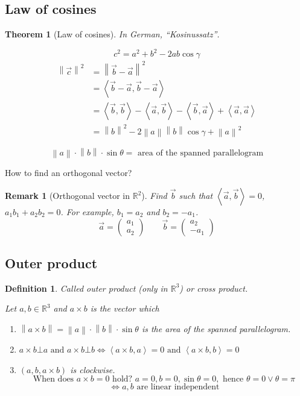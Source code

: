 \documentclass{article}
\newtheorem{theorem}{Theorem}  \numberwithin{theorem}{section}
\newtheorem{definition}{Definition}  \numberwithin{definition}{section}
\newtheorem{remark}{Remark}  \numberwithin{remark}{section}
\newcommand{\angel}[1]{\left\langle#1\right\rangle}
\newcommand{\norm}[1]{\left\|#1\right\|}
\newcommand{\rh}[1]{\vec{#1}}
\begin{document}
\subsection{Law of cosines}

\begin{theorem}[Law of cosines]
  In German, \foreignlanguage{german}{\enquote{Kosinussatz}}.

  \[ c^2 = a^2 + b^2 - 2ab \cos{\gamma} \]
  \begin{align*}
    \norm{\rh{c}}^2 &= \norm{\rh{b} - \rh{a}}^2 \\
      &= \angel{\rh{b} - \rh{a}, \rh{b} - \rh{a}} \\
      &= \angel{\rh{b}, \rh{b}} - \angel{\rh{a}, \rh{b}} - \angel{\rh{b}, \rh{a}} + \angel{\rh{a}, \rh{a}} \\
      &= \norm{b}^2 - 2 \norm{a} \norm{b} \cos\gamma + \norm{a}^2
  \end{align*}
\end{theorem}
\[ \norm a \cdot \norm b \cdot \sin\theta = \text{ area of the spanned parallelogram} \]

How to find an orthogonal vector?

\begin{remark}[Orthogonal vector in $\mathbb R^2$]
  Find $\vec{b}$ such that $\angel{\rh{a}, \rh{b}} = 0$, $a_1 b_1 + a_2 b_2 = 0$. For example, $b_1 = a_2$ and $b_2 = -a_1$.
  \[ \rh{a} = \begin{pmatrix} a_1 \\ a_2 \end{pmatrix} \qquad \rh{b} = \begin{pmatrix} a_2 \\ -a_1 \end{pmatrix} \]
\end{remark}

\subsection{Outer product}

\begin{definition} %
  Called \emph{outer product} (only in $\mathbb R^3$) or \emph{cross product}.

  Let $a,b \in \mathbb R^3$ and $a \times b$ is the vector which
  \begin{enumerate}
    \item $\norm{a \times b} = \norm{a} \cdot \norm{b} \cdot \sin{\theta}$ is the area of the spanned parallelogram.
    \item $a \times b \bot a \text{ and } a \times b \bot b
      \iff \angel{a \times b, a} = 0 \text{ and } \angel{a \times b, b} = 0$
    \item $(a, b, a \times b)$ is clockwise.
      \[ \text{When does } a \times b = 0 \text{ hold? } a = 0, b = 0, \sin\theta = 0, \text{ hence } \theta = 0 \lor \theta = \pi \]
      \[ \iff a,b \text{ are linear independent} \]
  \end{enumerate}
\end{definition}
\end{document}
